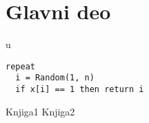 \documentclass[12pt,a4paper]{article}
\begin{document}








 














\section{Glavni deo}
u \cite{knjiga1}

\begin{lstlisting}[mathescape=true]
repeat
  i = Random(1, n)
  if x[i] == 1 then return i
\end{lstlisting}


\begin{thebibliography}{9}
  Knjiga1
  Knjiga2
\end{thebibliography}
\end{document}
